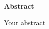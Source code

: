 \thispagestyle{plain} %

\begin{center}
\Huge  \textbf{Abstract}
\end{center}
\vspace{20pt}

\noindent Your abstract

\newpage
\fancyhead[R]{\bfseries\leftmark} %